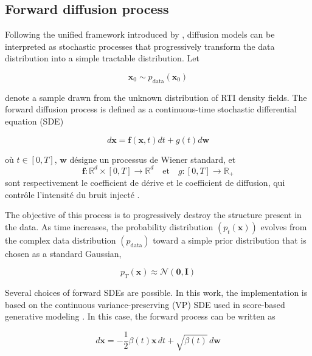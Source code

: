 
\subsection{Forward diffusion process}

Following the unified framework introduced by \citep{Song2021SDE}, diffusion models can be interpreted as stochastic processes that progressively transform the data distribution into a simple tractable distribution. Let

\begin{equation}
\mathbf{x}_0 \sim p_{\mathrm{data}}(\mathbf{x}_0)
\end{equation}


denote a sample drawn from the unknown distribution of RTI density fields. The forward diffusion process is defined as a continuous-time stochastic differential equation (SDE)

\begin{equation}
d\mathbf{x}
=
\mathbf{f}(\mathbf{x},t)dt
+
g(t)d\mathbf{w}
\end{equation}

où $t\in[0,T]$, $\mathbf{w}$ désigne un processus de Wiener standard, et
\[
\mathbf{f}:\mathbb{R}^{d}\times[0,T]\to\mathbb{R}^{d}
\quad\text{et}\quad
g:[0,T]\to\mathbb{R}_{+}
\]
sont respectivement le coefficient de dérive et le coefficient de diffusion,
qui contrôle l'intensité du bruit injecté \citep{Song2021SDE}.

The objective of this process is to progressively destroy the structure present in the data. As time increases, the probability distribution $(p_t(\mathbf{x}))$ evolves from the complex data distribution $(p_{\mathrm{data}})$ toward a simple prior distribution that is chosen as a standard Gaussian,

\begin{equation}
p_T(\mathbf{x})
\approx
\mathcal{N}(\mathbf{0},\mathbf{I})
\end{equation}

Several choices of forward SDEs are possible. In this work, the implementation is based on the continuous variance-preserving (VP) SDE used in score-based generative modeling \citep{Song2021SDE}. In this case, the forward process can be written as

\begin{equation}
d\mathbf{x}
=
-\frac{1}{2}\beta(t)\mathbf{x}\,dt
+
\sqrt{\beta(t)}\,d\mathbf{w}
\end{equation}


